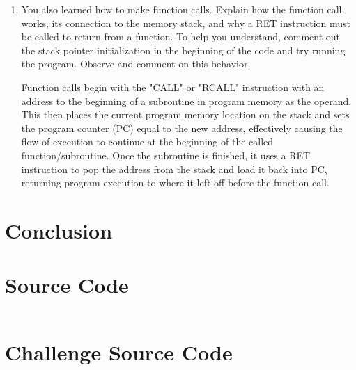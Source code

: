 \documentclass[12pt,letterpaper]{article}
\begin{document}
\begin{enumerate}
    \item You also learned how to make function calls. Explain how the function
        call works, its connection to the memory stack, and why a RET
        instruction must be called to return from a function. To help you
        understand, comment out the stack pointer initialization in the
        beginning of the code and try running the program. Observe and comment
        on this behavior.

        Function calls begin with the "CALL" or "RCALL" instruction with an
        address to the beginning of a subroutine in program memory as the
        operand.  This then places the current program memory location on the
        stack and sets the program counter (PC) equal to the new address,
        effectively causing the flow of execution to continue at the beginning
        of the called function/subroutine.  Once the subroutine is finished, it
        uses a RET instruction to pop the address from the stack and load it
        back into PC, returning program execution to where it left off before
        the function call.

\end{enumerate}

\section{Conclusion}

\section{Source Code}

\begin{verbatim}
\end{verbatim}

\pagebreak

\section{Challenge Source Code}

\begin{verbatim}
\end{verbatim}
\end{document}

